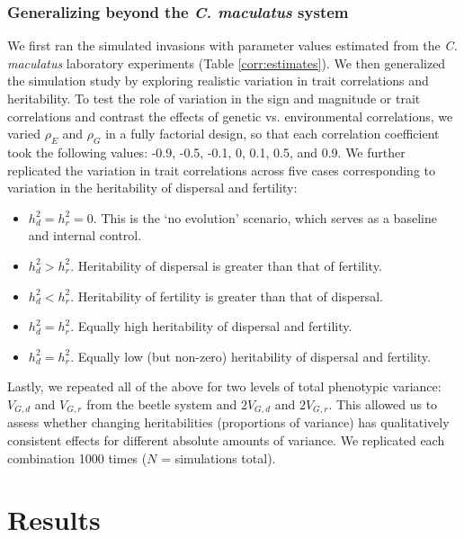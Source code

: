 \subsubsection{Generalizing beyond the \textit{C. maculatus} system}
We first ran the simulated invasions with parameter values estimated from the \textit{C. maculatus} laboratory experiments (Table \ref{corr:estimates}). We then generalized the simulation study by exploring realistic variation in trait correlations and heritability. To test the role of variation in the sign and magnitude or trait correlations and contrast the effects of genetic vs. environmental correlations, we varied $\rho_{E}$ and $\rho_{G}$ in a fully factorial design, so that each correlation coefficient took the following values: -0.9, -0.5, -0.1, 0, 0.1, 0.5, and 0.9. We further replicated the variation in trait correlations across five cases corresponding to variation in the heritability of dispersal and fertility: 
\begin{itemize}
  \item $h^{2}_d = h^{2}_r = 0$. This is the `no evolution' scenario, which serves as a baseline and internal control.
  \item $h^{2}_d > h^{2}_r$. Heritability of dispersal is greater than that of fertility.
  \item $h^{2}_d < h^{2}_r$. Heritability of fertility is greater than that of dispersal.
  \item $h^{2}_d = h^{2}_r$. Equally high heritability of dispersal and fertility.
  \item $h^{2}_d = h^{2}_r$. Equally low (but non-zero) heritability of dispersal and fertility.
\end{itemize}
Lastly, we repeated all of the above for two levels of total phenotypic variance: $V_{G,d}$ and $V_{G,r}$ from the beetle system and $2V_{G,d}$ and $2V_{G,r}$. This allowed us to assess whether changing heritabilities (proportions of variance) has qualitatively consistent effects for different absolute amounts of variance. We replicated each combination 1000 times ($N$ =  simulations total). 


\section{Results}

